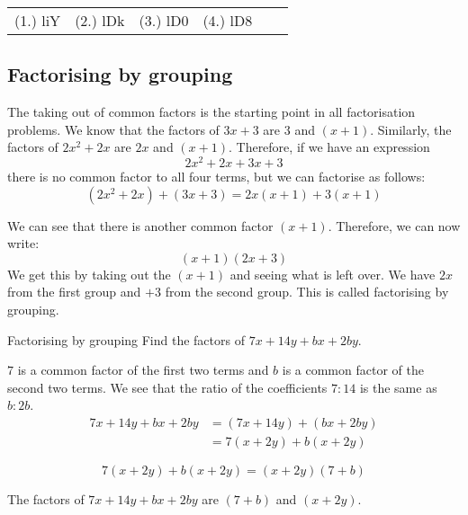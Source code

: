 \begin{exercises}{}
{\begin{enumerate}[itemsep=5pt, label=\textbf{\arabic*}. ]
\end{enumerate}
\practiceinfo 
\par 
 \par \begin{tabular}[h]{cccccc}
 (1.) liY  &  (2.) lDk  &  (3.) lD0  &  (4.) lD8  & \end{tabular}
}
\end{exercises} 


\subsection{Factorising by grouping}

The taking out of common factors is the starting point in all
factorisation problems. We know that the factors of $3x+3$ are $3$
and $(x+1)$. Similarly, the factors of $2{x}^{2}+2x$ are $2x$ and
$(x+1)$. Therefore, if we have an expression
\begin{equation*}
2{x}^{2}+2x+3x+3
\end{equation*}
there is no common factor to all four terms, but we can factorise as
follows:
\begin{equation*}
  (2{x}^{2}+2x)+(3x+3) = 2x(x+1)+3(x+1)
\end{equation*}

We can see that there is another common factor $(x+1)$. Therefore, we can now write:
\begin{equation*}
  (x+1)(2x+3)
\end{equation*}
We get this by taking out the $(x+1)$ and seeing what is left over. We
have $2x$ from the first group and $+3$ from the second group. This is
called factorising by grouping.



\begin{wex}{Factorising by grouping }{Find the factors of $7x+14y+bx+2by$.}
{



$7$ is a common factor of the first two terms and $b$ is a common
factor of the second two terms. We see that the ratio of the
coefficients $7:14$ is the same as $b:2b$.
\begin{align*}
7x+14y+bx+2by &= (7x+14y)+(bx+2by) \\ 
              &= 7(x+2y)+b(x+2y)
\end{align*}

\begin{equation*}
  7(x+2y)+b(x+2y)=(x+2y)(7+b)
\end{equation*}

The factors of $7x+14y+bx+2by$ are $(7+b)$ and $(x+2y)$.
}
\end{wex}

